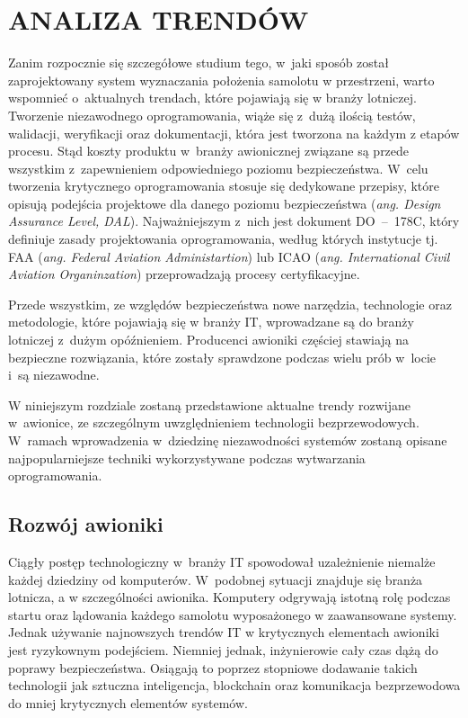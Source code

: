 \documentclass[a4paper, 12pt, twoside]{article}
\begin{document}
\newpage
\vspace*{1.5 cm}
\section{ANALIZA TRENDÓW}
\vspace{3.0 cm}
Zanim rozpocznie się szczegółowe studium tego, w~jaki sposób został zaprojektowany system wyznaczania położenia samolotu w przestrzeni, warto wspomnieć o~aktualnych trendach, które pojawiają się w branży lotniczej. Tworzenie niezawodnego oprogramowania, wiąże się z~dużą ilością testów, walidacji, weryfikacji oraz dokumentacji, która jest tworzona na każdym z etapów procesu. Stąd koszty produktu w~branży awionicznej związane są przede wszystkim z~zapewnieniem odpowiedniego poziomu bezpieczeństwa. W~celu tworzenia krytycznego oprogramowania stosuje się dedykowane przepisy, które opisują podejścia projektowe dla danego poziomu bezpieczeństwa (\textit{ang. Design Assurance Level, DAL}). Najważniejszym z~nich jest dokument DO~--~178C, który definiuje zasady projektowania oprogramowania, według których instytucje tj. FAA (\textit{ang. Federal Aviation Administartion}) lub ICAO (\textit{ang. International Civil Aviation Organinzation}) przeprowadzają procesy certyfikacyjne.

Przede wszystkim, ze względów bezpieczeństwa nowe narzędzia, technologie oraz metodologie, które pojawiają się w branży IT, wprowadzane są do branży lotniczej z~dużym opóźnieniem. Producenci awioniki częściej stawiają na bezpieczne rozwiązania, które zostały sprawdzone podczas wielu prób w~locie i~są niezawodne.

W niniejszym rozdziale zostaną przedstawione aktualne trendy rozwijane w~awionice, ze szczególnym uwzględnieniem technologii bezprzewodowych. W~ramach wprowadzenia w~dziedzinę niezawodności systemów zostaną opisane najpopularniejsze techniki wykorzystywane podczas wytwarzania oprogramowania.

\vspace{1.0 cm}
\subsection{Rozwój awioniki}

Ciągły postęp technologiczny w~branży IT spowodował uzależnienie niemalże każdej dziedziny od komputerów. W~podobnej sytuacji znajduje się branża lotnicza, a w szczególności awionika. Komputery odgrywają istotną rolę podczas startu oraz lądowania każdego samolotu wyposażonego w zaawansowane systemy. Jednak używanie najnowszych trendów IT w krytycznych elementach awioniki jest ryzykownym podejściem. Niemniej jednak, inżynierowie cały czas dążą do poprawy bezpieczeństwa. Osiągają to poprzez stopniowe dodawanie takich technologii jak sztuczna inteligencja, blockchain oraz komunikacja bezprzewodowa do mniej krytycznych elementów systemów.
\end{document}
